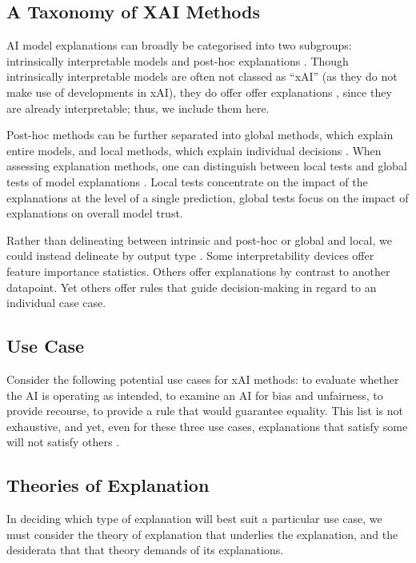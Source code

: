 \subsection{A Taxonomy of XAI Methods}
AI model explanations can broadly be categorised into two subgroups: intrinsically interpretable models and post-hoc explanations \cite{molnar_interpretable_2019}. Though intrinsically interpretable models are often not classed as ``xAI'' (as they do not make use of developments in xAI), they do offer offer explanations \cite{molnar_interpretable_2019}, since they are already interpretable; thus, we include them here.

Post-hoc methods can be further separated into global methods, which explain entire models, and local methods, which explain individual decisions \cite{molnar_interpretable_2019}. When assessing explanation methods, one can distinguish between local tests and global tests of model explanations \cite{molnar_interpretable_2019}. Local tests concentrate on the impact of the explanations at the level of a single prediction, global tests focus on the impact of explanations on overall model trust.

Rather than delineating between intrinsic and post-hoc or global and local, we could instead delineate by output type \cite{friedrich_taxonomy_2011}. Some interpretability devices offer feature importance statistics. Others offer explanations by contrast to another datapoint. Yet others offer rules that guide decision-making in regard to an individual case case.

\subsection{Use Case}
Consider the following potential use cases for xAI methods: to evaluate whether the AI is operating as intended, to examine an AI for bias and unfairness, to provide recourse, to provide a rule that would guarantee equality. This list is not exhaustive, and yet, even for these three use cases, explanations that satisfy some will not satisfy others \cite{natarajan_trust_2023}.

\subsection{Theories of Explanation}
In deciding which type of explanation will best suit a particular use case, we must consider the theory of explanation that underlies the explanation, and the desiderata that that theory demands of its explanations.

